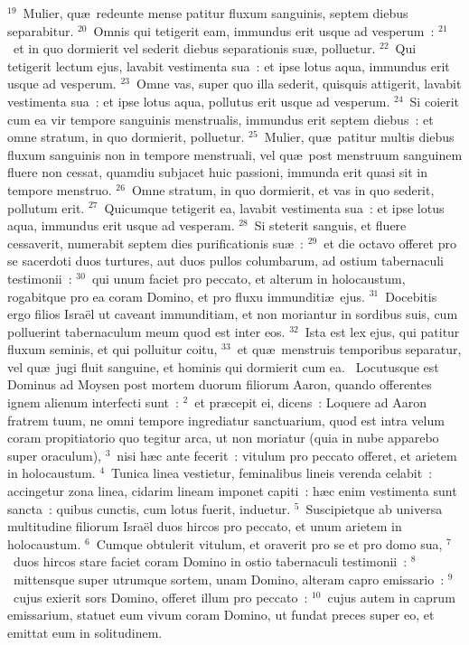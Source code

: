${}^{19}$~Mulier, qu\ae\ redeunte mense patitur fluxum sanguinis, septem diebus separabitur.
${}^{20}$~Omnis qui tetigerit eam, immundus erit usque ad vesperum~:
${}^{21}$~et in quo dormierit vel sederit diebus separationis su\ae , polluetur.
${}^{22}$~Qui tetigerit lectum ejus, lavabit vestimenta sua~: et ipse lotus aqua, immundus erit usque ad vesperum.
${}^{23}$~Omne vas, super quo illa sederit, quisquis attigerit, lavabit vestimenta sua~: et ipse lotus aqua, pollutus erit usque ad vesperum.
${}^{24}$~Si coierit cum ea vir tempore sanguinis menstrualis, immundus erit septem diebus~: et omne stratum, in quo dormierit, polluetur.
${}^{25}$~Mulier, qu\ae\ patitur multis diebus fluxum sanguinis non in tempore menstruali, vel qu\ae\ post menstruum sanguinem fluere non cessat, quamdiu subjacet huic passioni, immunda erit quasi sit in tempore menstruo.
${}^{26}$~Omne stratum, in quo dormierit, et vas in quo sederit, pollutum erit.
${}^{27}$~Quicumque tetigerit ea, lavabit vestimenta sua~: et ipse lotus aqua, immundus erit usque ad vesperam.
${}^{28}$~Si steterit sanguis, et fluere cessaverit, numerabit septem dies purificationis su\ae~:
${}^{29}$~et die octavo offeret pro se sacerdoti duos turtures, aut duos pullos columbarum, ad ostium tabernaculi testimonii~:
${}^{30}$~qui unum faciet pro peccato, et alterum in holocaustum, rogabitque pro ea coram Domino, et pro fluxu immunditi\ae\ ejus.
${}^{31}$~Docebitis ergo filios Isra\"el ut caveant immunditiam, et non moriantur in sordibus suis, cum polluerint tabernaculum meum quod est inter eos.
${}^{32}$~Ista est lex ejus, qui patitur fluxum seminis, et qui polluitur coitu,
${}^{33}$~et qu\ae\ menstruis temporibus separatur, vel qu\ae\ jugi fluit sanguine, et hominis qui dormierit cum ea.
~\lettrine[lines=10,image=true,loversize=0.05,lraise=-0.03]{L}{}ocutusque est Dominus ad Moysen post mortem duorum filiorum Aaron, quando offerentes ignem alienum interfecti sunt~:
${}^{2}$~et pr\ae cepit ei, dicens~: Loquere ad Aaron fratrem tuum, ne omni tempore ingrediatur sanctuarium, quod est intra velum coram propitiatorio quo tegitur arca, ut non moriatur (quia in nube apparebo super oraculum),
${}^{3}$~nisi h\ae c ante fecerit~: vitulum pro peccato offeret, et arietem in holocaustum.
${}^{4}$~Tunica linea vestietur, feminalibus lineis verenda celabit~: accingetur zona linea, cidarim lineam imponet capiti~: h\ae c enim vestimenta sunt sancta~: quibus cunctis, cum lotus fuerit, induetur.
${}^{5}$~Suscipietque ab universa multitudine filiorum Isra\"el duos hircos pro peccato, et unum arietem in holocaustum.
${}^{6}$~Cumque obtulerit vitulum, et oraverit pro se et pro domo sua,
${}^{7}$~duos hircos stare faciet coram Domino in ostio tabernaculi testimonii~:
${}^{8}$~mittensque super utrumque sortem, unam Domino, alteram capro emissario~:
${}^{9}$~cujus exierit sors Domino, offeret illum pro peccato~:
${}^{10}$~cujus autem in caprum emissarium, statuet eum vivum coram Domino, ut fundat preces super eo, et emittat eum in solitudinem.


